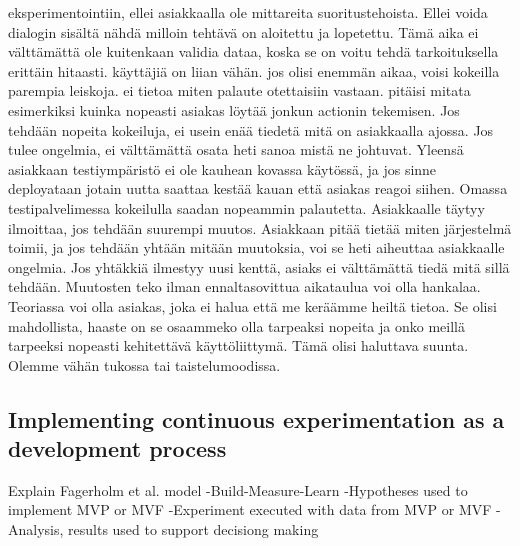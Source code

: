 \documentclass[english]{tktltiki2}
\theoremstyle{definition}
\theoremstyle{remark}
\begin{document}
eksperimentointiin, ellei asiakkaalla ole mittareita suoritustehoista. Ellei voida dialogin sisältä nähdä milloin tehtävä on aloitettu ja lopetettu. Tämä aika ei välttämättä ole kuitenkaan validia dataa, koska se on voitu tehdä tarkoituksella erittäin hitaasti.	käyttäjiä on liian vähän. jos olisi enemmän aikaa, voisi kokeilla parempia leiskoja. ei tietoa miten palaute otettaisiin vastaan. pitäisi mitata esimerkiksi kuinka nopeasti asiakas löytää jonkun actionin tekemisen. 	Jos tehdään nopeita kokeiluja, ei usein enää tiedetä mitä on asiakkaalla ajossa. Jos tulee ongelmia, ei välttämättä osata heti sanoa mistä ne johtuvat. Yleensä asiakkaan testiympäristö ei ole kauhean kovassa käytössä, ja jos sinne deployataan jotain uutta saattaa kestää kauan että asiakas reagoi siihen. Omassa testipalvelimessa kokeilulla saadan nopeammin palautetta. Asiakkaalle täytyy ilmoittaa, jos tehdään suurempi muutos. Asiakkaan pitää tietää miten järjestelmä toimii, ja jos tehdään yhtään mitään muutoksia, voi se heti aiheuttaa asiakkaalle ongelmia. Jos yhtäkkiä ilmestyy uusi kenttä, asiaks ei välttämättä tiedä mitä sillä tehdään. Muutosten teko ilman ennaltasovittua aikataulua voi olla hankalaa. Teoriassa voi olla asiakas, joka ei halua että me keräämme heiltä tietoa.	 	Se olisi mahdollista, haaste on se osaammeko olla tarpeaksi nopeita ja onko meillä tarpeeksi nopeasti kehitettävä käyttöliittymä. Tämä olisi haluttava suunta. Olemme vähän tukossa tai taistelumoodissa. 





\subsection{Implementing continuous experimentation as a development process}

Explain Fagerholm et al. model
-Build-Measure-Learn
-Hypotheses used to implement MVP or MVF
-Experiment executed with data from MVP or MVF
-Analysis, results used to support decisiong making
\end{document}

